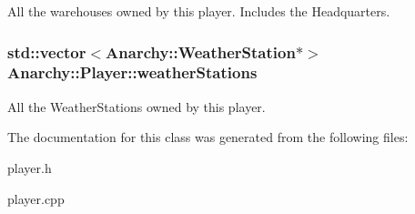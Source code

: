 All the warehouses owned by this player. Includes the Headquarters. 

\hypertarget{classAnarchy_1_1Player_a7738ef75a6b23b3d48a7b6084a21c59c}{
\subsubsection[{weather\-Stations}]{\setlength{\rightskip}{0pt plus 5cm}std\-::vector$<${\bf Anarchy\-::\-Weather\-Station}$\ast$$>$ Anarchy\-::\-Player\-::weather\-Stations}}\label{classAnarchy_1_1Player_a7738ef75a6b23b3d48a7b6084a21c59c}


All the Weather\-Stations owned by this player. 



The documentation for this class was generated from the following files\-:\begin{DoxyCompactItemize}
\item 
player.\-h\item 
player.\-cpp\end{DoxyCompactItemize}
